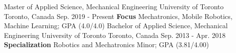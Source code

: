 \begin{cventries}
  \cventry
    {Master of Applied Science, Mechanical Engineering}
    {University of Toronto}
    {Toronto, Canada}
    {Sep. 2019 - Present}
    {\textbf{Focus} Mechatronics, Mobile Robotics, Machine Learning; GPA (4.0/4.0)}
  \cventry
    {Bachelor of Applied Science, Mechanical Engineering}
    {University of Toronto}
    {Toronto, Canada}
    {Sep. 2013 - Apr. 2018}
    {\textbf{Specialization} Robotics and Mechatronics Minor; GPA (3.81/4.00)}
\end{cventries}

